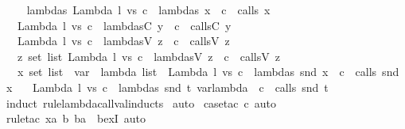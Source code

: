 %
\begin{isabellebody}%
\def\isabellecontext{CPSUtils}%
%
\isamarkupfalse%
\ \isanewline
\ \ \ lambdas{}{\isacharcolon}\ {\isachardoublequoteopen}Lambda\ l\ vs\ c\ {\isasymin}\ lambdas\ x\ {\isasymLongrightarrow}\ c\ {\isasymin}\ calls\ x{\isachardoublequoteclose}\isanewline
\ \ \ {\isachardoublequoteopen}Lambda\ l\ vs\ c\ {\isasymin}\ lambdasC\ y\ {\isasymLongrightarrow}\ c\ {\isasymin}\ callsC\ y{\isachardoublequoteclose}\isanewline
\ \ \ {\isachardoublequoteopen}Lambda\ l\ vs\ c\ {\isasymin}\ lambdasV\ z\ {\isasymLongrightarrow}\ c\ {\isasymin}\ callsV\ z{\isachardoublequoteclose}\isanewline
\ \ \ {\isachardoublequoteopen}{\isasymforall}z{\isasymin}\ set\ list{\isachardot}\ Lambda\ l\ vs\ c\ {\isasymin}\ lambdasV\ z\ {\isasymlongrightarrow}\ c\ {\isasymin}\ callsV\ z{\isachardoublequoteclose}\isanewline
\ \ \ {\isachardoublequoteopen}{\isasymforall}x{\isasymin}\ set\ {\isacharparenleft}list{}\ {\isacharcolon}{\isacharcolon}\ {\isacharparenleft}var\ {\isasymtimes}\ lambda{\isacharparenright}\ list{\isacharparenright}\ {\isachardot}\ Lambda\ l\ vs\ c\ {\isasymin}\ lambdas\ {\isacharparenleft}snd\ x{\isacharparenright}\ {\isasymlongrightarrow}\ c\ {\isasymin}\ calls\ {\isacharparenleft}snd\ x{\isacharparenright}{\isachardoublequoteclose}\isanewline
\ \ \ {\isachardoublequoteopen}Lambda\ l\ vs\ c\ {\isasymin}\ lambdas\ {\isacharparenleft}snd\ {\isacharparenleft}t{\isacharcolon}{\isacharcolon}\ var{\isasymtimes}lambda{\isacharparenright}{\isacharparenright}\ {\isasymLongrightarrow}\ c\ {\isasymin}\ calls\ {\isacharparenleft}snd\ t{\isacharparenright}{\isachardoublequoteclose}\isanewline
%
\isadelimproof
%
\endisadelimproof
%
\isatagproof
{}\isamarkupfalse%
\ {\isacharparenleft}induct\ rule{\isacharcolon}lambda{\isacharunderscore}call{\isacharunderscore}val{\isachardot}inducts{\isacharparenright}\isanewline
{}\isamarkupfalse%
\ auto\isanewline
{}\isamarkupfalse%
\ {\isacharparenleft}case{\isacharunderscore}tac\ c{\isacharcomma}\ auto{\isacharparenright}{\isacharbrackleft}{}{\isacharbrackright}\isanewline
{}\isamarkupfalse%
\ {\isacharparenleft}rule{\isacharunderscore}tac\ x{\isacharequal}{\isachardoublequoteopen}{\isacharparenleft}{\isacharparenleft}a{\isacharcomma}\ b{\isacharparenright}{\isacharcomma}\ ba{\isacharparenright}{\isachardoublequoteclose}\ \ bexI{\isacharcomma}\ auto{\isacharparenright}\isanewline
{}\isamarkupfalse%
%
\endisatagproof
{\isafoldproof}%
\end{isabellebody}%
